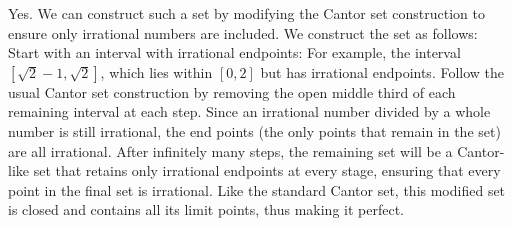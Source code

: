 \documentclass[12pt]{article}
\begin{document}
\begin{exercise}{18}
    \begin{solution}Yes. We can construct such a set by modifying the Cantor set construction to ensure only irrational numbers are included. We construct the set as follows: Start with an interval with irrational endpoints: For example, the interval \( [\sqrt{2} - 1, \sqrt{2}] \), which lies within \( [0, 2] \) but has irrational endpoints. Follow the usual Cantor set construction by removing the open middle third of each remaining interval at each step. Since an irrational number divided by a whole number is still irrational, the end points (the only points that remain in the set) are all irrational. After infinitely many steps, the remaining set will be a Cantor-like set that retains only irrational endpoints at every stage, ensuring that every point in the final set is irrational. Like the standard Cantor set, this modified set is closed and contains all its limit points, thus making it perfect. 
    \end{solution}
\end{exercise}
\end{document}
